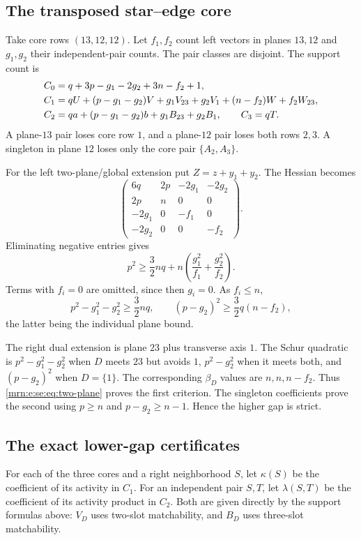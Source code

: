\documentclass[11pt,a4paper]{article}
\theoremstyle{remark}\newtheorem{remark}[theorem]{Remark}
\begin{document}
\subsection{The transposed star--edge core}
Take core rows $(13,12,12)$. Let $f_1,f_2$ count left vectors in planes $13,12$ and $g_1,g_2$ their independent-pair counts. The pair classes are disjoint. The support count is
\begin{align}
 C_0&=q+3p-g_1-2g_2+3n-f_2+1,\label{mrn:e:se:eq:transpose}\\
 C_1&=qU+(p-g_1-g_2)V+g_1V_{23}+g_2V_1
                  +(n-f_2)W+f_2W_{23},\notag\\
 C_2&=qa+(p-g_1-g_2)b+g_1B_{23}+g_2B_1,\qquad C_3=qT.\notag
\end{align}
A plane-$13$ pair loses core row $1$, and a plane-$12$ pair loses both rows $2,3$. A singleton in plane $12$ loses only the core pair $\{A_2,A_3\}$.

For the left two-plane/global extension put $Z=z+y_1+y_2$. The Hessian becomes
\[
 \begin{pmatrix}
 6q&2p&-2g_1&-2g_2\\
 2p&n&0&0\\
 -2g_1&0&-f_1&0\\
 -2g_2&0&0&-f_2
 \end{pmatrix}.
\]
Eliminating negative entries gives
\[
 p^2\ge\frac32nq+n\left(\frac{g_1^2}{f_1}+\frac{g_2^2}{f_2}\right).
\]
Terms with $f_i=0$ are omitted, since then $g_i=0$. As $f_i\le n$,
\begin{equation}\label{mrn:e:se:eq:two-plane}
 p^2-g_1^2-g_2^2\ge\frac32nq,\qquad
 (p-g_2)^2\ge\frac32q(n-f_2),
\end{equation}
the latter being the individual plane bound.

The right dual extension is plane $23$ plus transverse axis $1$. The Schur quadratic is $p^2-g_1^2-g_2^2$ when $D$ meets $23$ but avoids $1$, $p^2-g_2^2$ when it meets both, and $(p-g_2)^2$ when $D=\{1\}$. The corresponding $\beta_D$ values are $n,n,n-f_2$. Thus \eqref{mrn:e:se:eq:two-plane} proves the first criterion. The singleton coefficients prove the second using $p\ge n$ and $p-g_2\ge n-1$. Hence the higher gap is strict.

\subsection{The exact lower-gap certificates}
For each of the three cores and a right neighborhood $S$, let $\kappa(S)$ be the coefficient of its activity in $C_1$. For an independent pair $S,T$, let $\lambda(S,T)$ be the coefficient of its activity product in $C_2$. Both are given directly by the support formulas above: $V_D$ uses two-slot matchability, and $B_D$ uses three-slot matchability.
\end{document}
